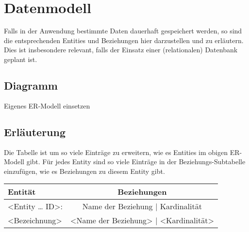 \chapter{Datenmodell}
Falls in der Anwendung bestimmte Daten dauerhaft gespeichert werden, so sind
die entsprechenden Entities und Beziehungen hier darzustellen und zu erläutern.
Dies ist insbesondere relevant, falls der Einsatz einer (relationalen)
Datenbank geplant ist.

\section{Diagramm}

Eigenes ER-Modell einsetzen
\section{Erläuterung}
Die Tabelle ist um so viele Einträge zu erweitern, wie es Entities im obigen
ER-Modell gibt. Für jedes Entity sind so viele Einträge in der
Beziehungs-Subtabelle einzufügen, wie es Beziehungen zu diesem Entity gibt.


\begin{tabular}[ht]{|l|c|}
  \hline
  Entität & Beziehungen\\
  \hline\hline
  <Entity … ID>:  & Name der Beziehung |  Kardinalität\\
  \hline\hline\hline
  <Bezeichnung> & <Name der Beziehung> | <Kardinalität>\\
  \hline
\end{tabular}
